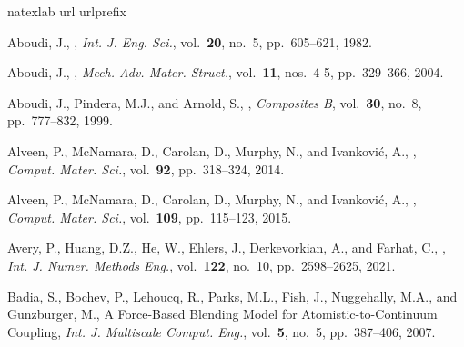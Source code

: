 \begin{thebibliography}{62}
\expandafter\ifx\csname natexlab\endcsname\relax\def\natexlab#1{#1}\fi
\expandafter\ifx\csname url\endcsname\relax
  \def\url#1{\texttt{#1}}\fi
\expandafter\ifx\csname urlprefix\endcsname\relax\def\urlprefix{URL }\fi

Aboudi, J., , {\em Int. J. Eng.
  Sci.}, vol.~{\bf 20}, no.~5, pp.~605--621, 1982.

Aboudi, J., ,
  {\em Mech. Adv. Mater. Struct.}, vol.~{\bf 11}, nos.~4-5,
  pp.~329--366, 2004.

Aboudi, J., Pindera, M.J., and Arnold, S., , {\em Composites B},
  vol.~{\bf 30}, no.~8, pp.~777--832, 1999.

Alveen, P., McNamara, D., Carolan, D., Murphy, N., and Ivankovi{\'{c}}, A.,
  , {\em Comput. Mater. Sci.}, vol.~{\bf 92}, pp.~318--324,
  2014.

Alveen, P., McNamara, D., Carolan, D., Murphy, N., and Ivankovi{\'{c}}, A.,
  , {\em Comput. Mater. Sci.},
  vol.~{\bf 109}, pp.~115--123, 2015.

Avery, P., Huang, D.Z., He, W., Ehlers, J., Derkevorkian, A., and Farhat, C.,
  , {\em Int. J.
    Numer. Methods Eng.}, vol.~{\bf 122}, no.~10,
  pp.~2598--2625, 2021.

Badia, S., Bochev, P., Lehoucq, R., Parks, M.L., Fish, J., Nuggehally, M.A.,
  and Gunzburger, M., {A Force-Based Blending Model
  for Atomistic-to-Continuum Coupling}, {\em Int. J.
  Multiscale Comput. Eng.}, vol.~{\bf 5}, no.~5, pp.~387--406,
  2007.


\end{thebibliography}
